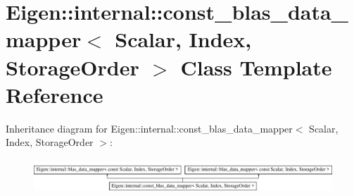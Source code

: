 \hypertarget{class_eigen_1_1internal_1_1const__blas__data__mapper}{}\section{Eigen\+:\+:internal\+:\+:const\+\_\+blas\+\_\+data\+\_\+mapper$<$ Scalar, Index, Storage\+Order $>$ Class Template Reference}
\label{class_eigen_1_1internal_1_1const__blas__data__mapper}
Inheritance diagram for Eigen\+:\+:internal\+:\+:const\+\_\+blas\+\_\+data\+\_\+mapper$<$ Scalar, Index, Storage\+Order $>$\+:\begin{figure}[H]
\begin{center}
\leavevmode
\includegraphics[height=1.293303cm]{class_eigen_1_1internal_1_1const__blas__data__mapper}
\end{center}
\end{figure}
